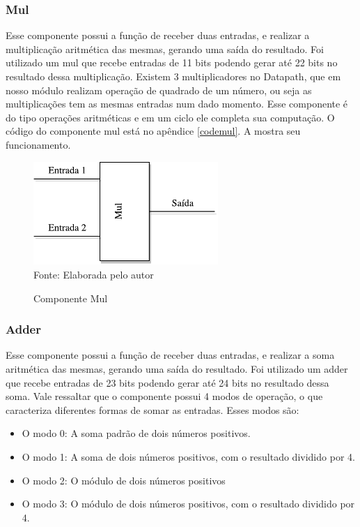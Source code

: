 \subsubsection{Mul}
Esse componente possui a função de receber duas entradas, e realizar a multiplicação aritmética das mesmas, gerando uma saída do resultado. Foi utilizado um mul que recebe entradas de 11 bits podendo gerar até 22 bits no resultado dessa multiplicação. Existem 3 multiplicadores no Datapath, que em nosso módulo realizam operação de quadrado de um número, ou seja as multiplicações tem as mesmas entradas num dado momento. Esse componente é do tipo operações aritméticas e em um ciclo ele completa sua computação. O código do componente mul está no apêndice \ref{codemul}. A  mostra seu funcionamento.

\begin{figure}[H]
	\centering
	\caption{Componente Mul}
	\includegraphics[width=7cm]{figures/Mul.pdf}\\
	
	{Fonte: Elaborada pelo autor}
	\label{Mul}
\end{figure}



\subsubsection{Adder}
Esse componente possui a função de receber duas entradas, e realizar a soma aritmética das mesmas, gerando uma saída do resultado. Foi utilizado um adder que recebe entradas de 23 bits podendo gerar até 24 bits no resultado dessa soma. Vale ressaltar que o componente possui 4 modos de operação, o que caracteriza diferentes formas de somar as entradas. Esses modos são:
\begin{itemize}
	\item O modo 0: A soma padrão de dois números positivos.
	\item O modo 1: A soma de dois números positivos, com o resultado dividido por 4.
	\item O modo 2: O módulo de dois números positivos
	\item O modo 3: O módulo de dois números positivos, com o resultado dividido por 4.
\end{itemize}

